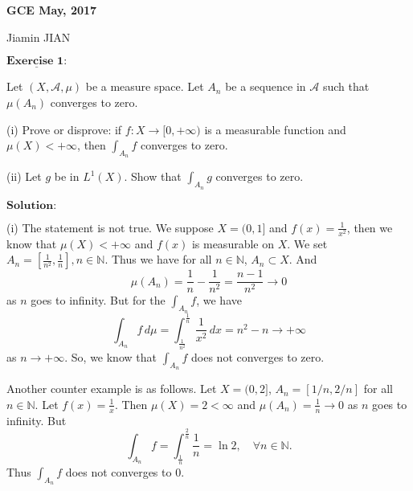 \documentclass[12pt,a4paper]{ctexart}
\begin{document}
\begin{center}
\textbf{ GCE May, 2017}
\vspace{8pt}

Jiamin JIAN
\end{center}

\vspace{12pt}


$\underline{\textbf{Exercise 1:}}$

Let $(X, \mathcal{A}, \mu)$ be a measure space. Let $A_{n}$ be a sequence in $\mathcal{A}$ such that $\mu(A_{n})$ converges to zero.

(i) Prove or disprove: if $f : X \rightarrow [0, + \infty)$ is a measurable function and $\mu(X) < + \infty$, then $\int_{A_{n}}^{} f$ converges to zero.

(ii) Let $g$ be in $L^{1}(X)$. Show that $\int_{A_{n}}^{} g$ converges to zero.

\vspace{8pt}

$\textbf{Solution:}$

(i) The statement is not true. We suppose $X = (0, 1]$ and $f(x) = \frac{1}{x^{2}}$, then we know that $\mu(X) < + \infty$ and $f(x)$ is measurable on $X$. We set $A_{n} = [\frac{1}{n^{2}}, \frac{1}{n}], n \in \mathbb{N}$. Thus we have for all $n \in \mathbb{N}$, $A_{n} \subset X$. And
\begin{equation*}
   \mu(A_{n}) = \frac{1}{n} - \frac{1}{n^{2}} = \frac{n - 1}{n^{2}} \to 0
\end{equation*}
as $n$ goes to infinity. But for the $\int_{A_{n}}^{} f$, we have
\begin{equation*}
   \int_{A_{n}}^{} f \, d \mu = \int_{\frac{1}{n^{2}}}^{\frac{1}{n}} \frac{1}{x^{2}} \, d x = n^{2} - n \to + \infty
\end{equation*}
as $n \to + \infty$. So, we know that $\int_{A_{n}}^{} f$ does not converges to zero.

Another counter example is as follows. Let $X = (0, 2]$, $A_n = [1/n, 2/n]$ for all $n \in \mathbb N$. Let $f (x) = \frac{1}{x}$. Then $\mu(X) = 2 < \infty$ and $\mu(A_n) = \frac{1}{n} \to 0$ as $n$ goes to infinity. But
$$\int_{A_n} f = \int_{\frac{1}{n}}^{\frac{2}{n}} \frac{1}{n} = \ln{2}, \quad \forall n \in \mathbb N.$$
Thus $\int_{A_n} f$ does not converges to $0$.
\vspace{8pt}
\end{document}

